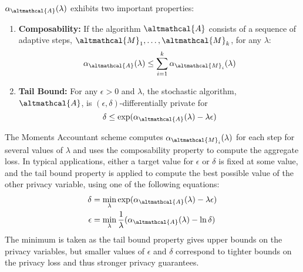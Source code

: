 \begin{theorem}
	$\alpha_\altmathcal{A}(\lambda)$ exhibits two important properties: \begin{enumerate}
		\item \textbf{Composability:} If the algorithm $\altmathcal{A}$ consists of a sequence of adaptive steps, $\altmathcal{M}_1, \ldots, \altmathcal{M}_k$, for any $\lambda$:
		\begin{equation}
		\alpha_\altmathcal{A}(\lambda) \leq \sum_{i=1}^k \alpha_{\altmathcal{M}_i}(\lambda)
		\end{equation}
		
		\item \textbf{Tail Bound:} For any $\epsilon > 0$ and $\lambda$, the stochastic algorithm, $\altmathcal{A}$, is $(\epsilon, \delta)$-differentially private for
		\begin{equation}
		\delta \leq \exp(\alpha_{\altmathcal{A}}(\lambda) - \lambda \epsilon)
		\end{equation}
	\end{enumerate}
\end{theorem}
The Moments Accountant scheme computes $\alpha_{\altmathcal{M}_i}(\lambda)$ for each step for several values of $\lambda$ and uses the composability property to compute the aggregate loss. In typical applications, either a target value for $\epsilon$ or $\delta$ is fixed at some value, and the tail bound property is applied to compute the best possible value of the other privacy variable, using one of the following equations:
\begin{align}
\delta &= \min_\lambda \exp(\alpha_{\altmathcal{A}}(\lambda) - \lambda \epsilon) \\
\epsilon &= \min_\lambda \frac{1}{\lambda} (\alpha_{\altmathcal{A}}(\lambda) - \ln \delta)
\end{align}
The minimum is taken as the tail bound property gives upper bounds on the privacy variables, but smaller values of $\epsilon$ and $\delta$ correspond to tighter bounds on the privacy loss and thus stronger privacy guarantees.

